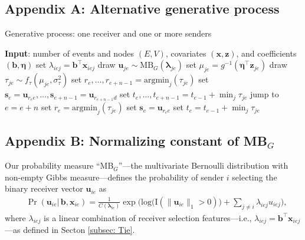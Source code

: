 \documentclass[ba]{imsart}
\numberwithin{equation}{section}
\theoremstyle{plain}
\begin{document}
	\subsection*{Appendix A: Alternative generative process} \label{appendix:alternativeGP}
	\begin{algorithm}[H]
		\SetAlgoLined
		\caption{Generative process: one receiver and one or more senders}
		\begin{algorithmic}
			\STATE \textbf{Input}: number of events and nodes $(E, V)$, covariates $(\boldsymbol{x}, \boldsymbol{z})$, and coefficients $(\boldsymbol{b}, \boldsymbol{\eta})$
			\vskip 0.1in				
			\STATE	set $\lambda_{iej} = {\boldsymbol{b}}^{\top}\boldsymbol{x}_{iej}$
			\ENDFOR
			\STATE	draw $\boldsymbol{u}_{je}  \sim
			\mbox{MB}_G(\boldsymbol{\lambda}_{je})$
			\STATE		set $\mu_{je} = g^{-1}(\boldsymbol{\eta}^\top \boldsymbol{z}_{je})$
			\STATE		draw $\tau_{je} \sim f_\tau(\mu_{je}, \sigma_\tau^2)$
			\ENDFOR
			\STATE	set ${r}_e,\ldots, r_{e+n-1}=\mbox{argmin}_{j}(\tau_{je})$
			\STATE	set $\boldsymbol{s}_e=\boldsymbol{u}_{r_e e},\ldots,\boldsymbol{s}_{e+n-1}=\boldsymbol{u}_{r_{e+n-1} d}$
			\STATE	set $t_e, \ldots, t_{e+n-1}=t_{e-1} + \min_j\tau_{je}$
			\STATE		jump to $e = e+n$
			\ELSE
			\STATE	set ${r}_e = \mbox{argmin}_{j}(\tau_{je}) $
			\STATE	set $\boldsymbol{s}_e= \boldsymbol{u}_{r_e e}$
			\STATE	set $t_e =t_{e-1} + \min_j\tau_{je}$
			\ENDIF
			\ENDFOR
		\end{algorithmic}
		\label{alg:generative2}
	\end{algorithm}
	\subsection*{Appendix B: Normalizing constant of MB$_{G}$}\label{appendix: non-empty Gibbs measure}
	Our probability measure ``MB$_{G}$''---the multivariate Bernoulli distribution with non-empty Gibbs measure---defines the probability of sender $i$ selecting the binary receiver vector $\boldsymbol{u}_{ie}$ as
	\begin{equation*} 
		\begin{aligned}
			& \Pr(\boldsymbol{u}_{ie}|\,\boldsymbol{b}, \boldsymbol{x}_{ie}) = \frac{1}{C(\boldsymbol{\lambda}_{ie})}\exp\Big(\mbox{log}\big(\text{I}(\lVert \boldsymbol{u}_{ie} \rVert_1 > 0)\big) + \sum_{j \neq i} \lambda_{iej}u_{iej} \Big),
		\end{aligned}
	\end{equation*}
	where $\lambda_{iej}$ is a linear combination of receiver selection features---i.e., $\lambda_{iej} = {\boldsymbol{b}}^{\top}\boldsymbol{x}_{iej}$---as defined in Secton \ref{subsec: Tie}.
	
\end{document}

